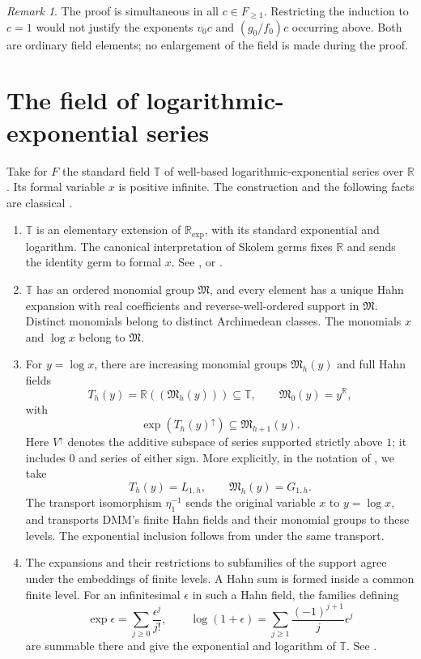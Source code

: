 \documentclass[11pt]{article}
\theoremstyle{definition}
\theoremstyle{remark}
\newtheorem{remark}[theorem]{Remark}
\newcommand{\R}{\mathbb R}
\newcommand{\T}{\mathbb T}
\newcommand{\up}{\uparrow}
\numberwithin{equation}{section}
\begin{document}
\begin{remark}
The proof is simultaneous in all $c\in F_{\ge1}$. Restricting the
induction to $c=1$ would not justify the exponents $v_0c$ and
$(g_0/f_0)c$ occurring above. Both are ordinary field elements;
no enlargement of the field is made during the proof.
\end{remark}

\section{The field of logarithmic-exponential series}\label{sf:sec:series}

Take for $F$ the standard field $\T$ of well-based
logarithmic-exponential series over $\R$. Its formal variable $x$
is positive infinite. The construction and the following facts are
classical \cite{DMM97,DMM01}.

\begin{enumerate}[label=\textup{(LE\arabic*)},leftmargin=4.2em]
\item $\T$ is an elementary extension of $\R_{\exp}$, with its
standard exponential and logarithm. The canonical interpretation of
Skolem germs fixes $\R$ and sends the identity germ to formal $x$.
See \cite[Corollary~2.8, (2.11), and (3.10)]{DMM97}, or
\cite[(3.11)--(3.12)]{DMM01}.
\item $\T$ has an ordered monomial group $\mathfrak M$, and every
element has a unique Hahn expansion with real coefficients and
reverse-well-ordered support in $\mathfrak M$. Distinct monomials
belong to distinct Archimedean classes. The monomials $x$ and
$\log x$ belong to $\mathfrak M$.
\item For $y=\log x$, there are increasing monomial groups
$\mathfrak M_h(y)$ and full Hahn fields
\[
 T_h(y)=\R((\mathfrak M_h(y)))\subseteq\T,\qquad
 \mathfrak M_0(y)=y^{\R},
\]
with
\[
 \exp(T_h(y)^\up)\subseteq\mathfrak M_{h+1}(y).
\]
Here $V^\up$ denotes the additive subspace of series supported
strictly above $1$; it includes $0$ and series of either sign.
More explicitly, in the notation of \cite[(2.7)--(2.8)]{DMM01},
we take
\[
 T_h(y)=L_{1,h},\qquad \mathfrak M_h(y)=G_{1,h}.
\]
The transport isomorphism $\eta_1^{-1}$ sends the original
variable $x$ to $y=\log x$, and transports DMM's finite Hahn
fields and their monomial groups to these levels. The exponential
inclusion follows from \cite[(2.1) and Lemma~2.2]{DMM01}
under the same transport.
\item The expansions and their restrictions to subfamilies of the
support agree under the embeddings of finite levels. A Hahn sum is
formed inside a common finite level. For an infinitesimal
$\epsilon$ in such a Hahn field, the families defining
\[
 \exp\epsilon=\sum_{j\ge0}\frac{\epsilon^j}{j!},\qquad
 \log(1+\epsilon)=\sum_{j\ge1}\frac{(-1)^{j+1}}j\epsilon^j
\]
are summable there and give the exponential and logarithm of $\T$.
See \cite[\S1 and (2.4), (2.7)--(2.8)]{DMM01}.
\end{enumerate}
\end{document}

